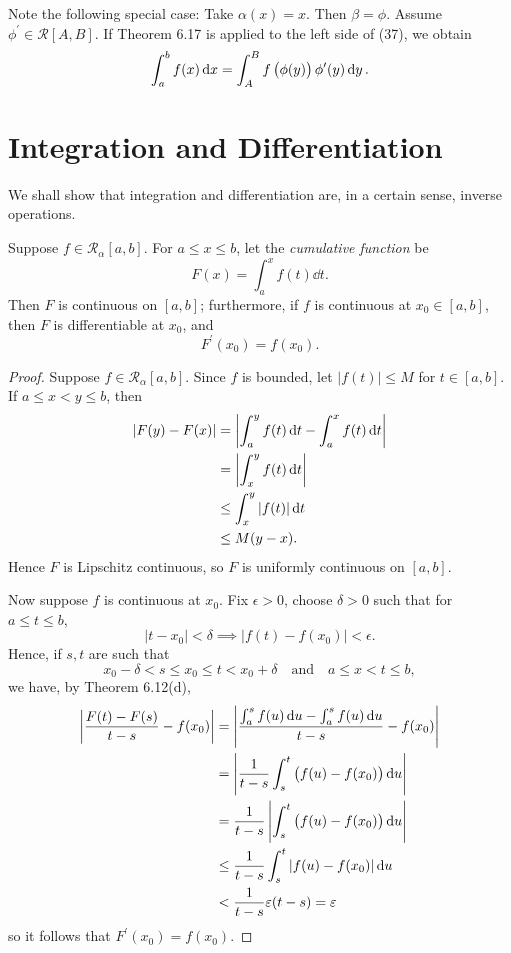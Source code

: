 Note the following special case: Take $\alpha(x)=x$. Then $\beta=\phi$. Assume $\phi^\prime\in\mathcal{R}[A,B]$. If Theorem 6.17 is applied to the left side of (37), we obtain
\[\int_{a}^{b}f(x)\dd{x}=\int_{A}^{B}f\left(\phi(y)\right)\phi^\prime(y)\dd{y}.\]
\pagebreak

\section{Integration and Differentiation}
We shall show that integration and differentiation are, in a certain sense, inverse operations.

\begin{theorem}
Suppose $f\in \mathcal{R}_\alpha[a,b]$. For $a\le x\le b$, let the \emph{cumulative function} be
\[F(x)=\int_a^x f(t)\dd{t}.\]
Then $F$ is continuous on $[a,b]$; furthermore, if $f$ is continuous at $x_0\in[a,b]$, then $F$ is differentiable at $x_0$, and
\[F^\prime(x_0)=f(x_0).\]
\end{theorem}

\begin{proof}
Suppose $f\in\mathcal{R}_\alpha[a,b]$. Since $f$ is bounded, let $|f(t)|\le M$ for $t\in[a,b]$. If $a\le x<y\le b$, then
\begin{align*}
|F(y)-F(x)|
&=\left|\int_{a}^{y}f(t)\dd{t}-\int_{a}^{x}f(t)\dd{t}\right|\\
&=\left|\int_{x}^{y}f(t)\dd{t}\right|\\
&\le\int_{x}^{y}|f(t)|\dd{t}\\
&\le M(y-x).
\end{align*}
Hence $F$ is Lipschitz continuous, so $F$ is uniformly continuous on $[a,b]$.

Now suppose $f$ is continuous at $x_0$. Fix $\epsilon>0$, choose $\delta>0$ such that for $a\le t\le b$,
\[|t-x_0|<\delta\implies|f(t)-f(x_0)|<\epsilon.\]
Hence, if $s,t$ are such that
\[x_0-\delta<s\le x_0\le t<x_0+\delta\quad\text{and}\quad a\le x<t\le b,\]
we have, by Theorem 6.12(d),
\begin{align*}
\left|\frac{F(t)-F(s)}{t-s}-f(x_0)\right|
&=\left|\frac{\int_{a}^{s}f(u)\dd{u}-\int_{a}^{s}f(u)\dd{u}}{t-s}-f(x_0)\right|\\
&=\left|\frac{1}{t-s}\int_{s}^{t}\left(f(u)-f(x_0)\right)\dd{u}\right|\\
&=\frac{1}{t-s}\left|\int_{s}^{t}\left(f(u)-f(x_0)\right)\dd{u}\right|\\
&\le\frac{1}{t-s}\int_{s}^{t}|f(u)-f(x_0)|\dd{u}\\
&<\frac{1}{t-s}\varepsilon(t-s)=\varepsilon
\end{align*}
so it follows that $F^\prime(x_0)=f(x_0)$.
\end{proof}

